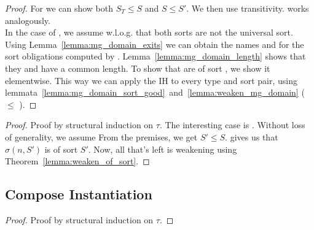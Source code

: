 \begin{theorem}
\end{theorem}
\begin{proof}
    For  we can show both \(S_T \leq S\) and \(S \leq S'\).
    We then use transitivity.
     works analogously.\\
    In the case of , we assume w.l.o.g. that both sorts are not the universal sort.
    Using Lemma~\ref{lemma:mg_domain_exits} we can obtain the names  and  for the sort obligations computed by .
    Lemma~\ref{lemma:mg_domain_length} shows that they and  have a common length.
    To show that  are of sort , we show it elementwise.
    This way we can apply the IH to every type and sort pair, using lemmata~\ref{lemma:mg_domain_sort_good}\ and~\ref{lemma:weaken_mg_domain} ( \(\leq\) ).
\end{proof}

\begin{corollary}
\end{corollary}
\begin{proof}
Proof by structural induction on \(\tau\).
The interesting case is .
Without loss of generality, we assume 
From the premises, we get \(S' \leq S\).
 gives us that \(\sigma (n, S')\) is of sort \(S'\).
Now, all that's left is weakening using Theorem~\ref{lemma:weaken_of_sort}.
\end{proof}

\subsection{Compose Instantiation}

\begin{lemma}
\end{lemma}
\begin{proof}
    Proof by structural induction on \(\tau\).
\end{proof}

\begin{quote}
\begin{isabelle}
     
\end{isabelle}
\end{quote}


